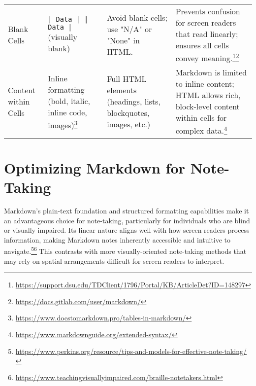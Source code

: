 \begin{table}[h!]
\begin{tabular}{|l|l|l|l|}
\addlinespace
Blank Cells & \texttt{| Data | | Data |} (visually blank) & Avoid blank cells; use "N/A" or "None" in HTML. & Prevents confusion for screen readers that read linearly; ensures all cells convey meaning.\footnote{\url{https://support.dsu.edu/TDClient/1796/Portal/KB/ArticleDet?ID=148297}}\footnote{\url{https://docs.gitlab.com/user/markdown/}} \\
\addlinespace
Content within Cells & Inline formatting (bold, italic, inline code, images)\footnote{\url{https://www.docstomarkdown.pro/tables-in-markdown/}} & Full HTML elements (headings, lists, blockquotes, images, etc.) & Markdown is limited to inline content; HTML allows rich, block-level content within cells for complex data.\footnote{\url{https://www.markdownguide.org/extended-syntax/}} \\
\bottomrule
\end{tabular}
\end{table}

\section{Optimizing Markdown for Note-Taking}

Markdown's plain-text foundation and structured formatting capabilities make it an advantageous choice for note-taking, particularly for individuals who are blind or visually impaired. Its linear nature aligns well with how screen readers process information, making Markdown notes inherently accessible and intuitive to navigate.\footnote{\url{https://www.perkins.org/resource/tips-and-models-for-effective-note-taking/}}\footnote{\url{https://www.teachingvisuallyimpaired.com/braille-notetakers.html}} This contrasts with more visually-oriented note-taking methods that may rely on spatial arrangements difficult for screen readers to interpret.

